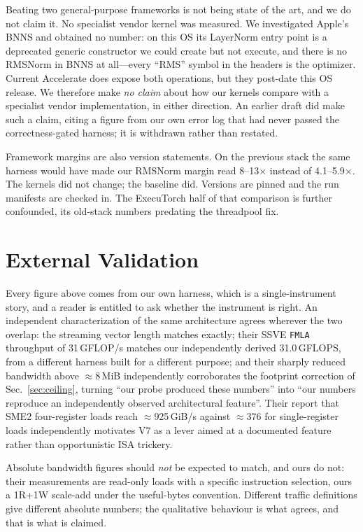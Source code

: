 \documentclass[conference,10pt]{IEEEtran}
\newcommand{\code}[1]{\texttt{\small #1}}
\begin{document}
Beating two general-purpose frameworks is not being state of the art, and we do
not claim it. No specialist vendor kernel was measured. We investigated Apple's
BNNS and obtained no number: on this OS its LayerNorm entry point is a
deprecated generic constructor we could create but not execute, and there is no
RMSNorm in BNNS at all---every ``RMS'' symbol in the headers is the optimizer.
Current Accelerate does expose both operations, but they post-date this OS
release. We therefore make \emph{no claim} about how our kernels compare with a
specialist vendor implementation, in either direction. An earlier draft did make
such a claim, citing a figure from our own error log that had never passed the
correctness-gated harness; it is withdrawn rather than restated.

Framework margins are also version statements. On the previous stack the same
harness would have made our RMSNorm margin read 8--13$\times$ instead of
4.1--5.9$\times$. The kernels did not change; the baseline did. Versions are
pinned and the run manifests are checked in. The ExecuTorch half of that
comparison is further confounded, its old-stack numbers predating the
threadpool fix.

\section{External Validation}

Every figure above comes from our own harness, which is a single-instrument
story, and a reader is entitled to ask whether the instrument is right. An
independent characterization of the same architecture agrees wherever the two
overlap: the streaming vector length matches exactly; their SSVE \code{FMLA}
throughput of 31\,GFLOP/s matches our independently derived 31.0\,GFLOPS, from a
different harness built for a different purpose; and their sharply reduced
bandwidth above $\approx$8\,MiB independently corroborates the footprint
correction of Sec.~\ref{sec:ceiling}, turning ``our probe produced these
numbers'' into ``our numbers reproduce an independently observed architectural
feature''. Their report that SME2 four-register loads reach $\approx$925\,GiB/s
against $\approx$376 for single-register loads independently motivates V7 as a
lever aimed at a documented feature rather than opportunistic ISA trickery.

Absolute bandwidth figures should \emph{not} be expected to match, and ours do
not: their measurements are read-only loads with a specific instruction
selection, ours a 1R+1W scale-add under the useful-bytes convention. Different
traffic definitions give different absolute numbers; the qualitative behaviour
is what agrees, and that is what is claimed.
\end{document}
